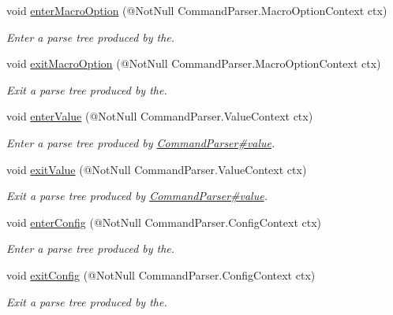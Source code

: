 \begin{DoxyCompactItemize}
void \hyperlink{interfaceedu_1_1udel_1_1cis_1_1vsl_1_1civl_1_1run_1_1common_1_1CommandListener_a5597c066408f2cfd680e14f0e695cbef}{enter\+Macro\+Option} (@Not\+Null Command\+Parser.\+Macro\+Option\+Context ctx)
\begin{DoxyCompactList}\small\item\em Enter a parse tree produced by the. \end{DoxyCompactList}\item 
void \hyperlink{interfaceedu_1_1udel_1_1cis_1_1vsl_1_1civl_1_1run_1_1common_1_1CommandListener_aad9c8bd2f680f4a643cb0f66ca9ee0d4}{exit\+Macro\+Option} (@Not\+Null Command\+Parser.\+Macro\+Option\+Context ctx)
\begin{DoxyCompactList}\small\item\em Exit a parse tree produced by the. \end{DoxyCompactList}\item 
void \hyperlink{interfaceedu_1_1udel_1_1cis_1_1vsl_1_1civl_1_1run_1_1common_1_1CommandListener_a819daf02b26ecfe5be342decf18c6515}{enter\+Value} (@Not\+Null Command\+Parser.\+Value\+Context ctx)
\begin{DoxyCompactList}\small\item\em Enter a parse tree produced by \hyperlink{}{Command\+Parser\#value}. \end{DoxyCompactList}\item 
void \hyperlink{interfaceedu_1_1udel_1_1cis_1_1vsl_1_1civl_1_1run_1_1common_1_1CommandListener_a5aa0d5b13176f22cf98964b03cc7badc}{exit\+Value} (@Not\+Null Command\+Parser.\+Value\+Context ctx)
\begin{DoxyCompactList}\small\item\em Exit a parse tree produced by \hyperlink{}{Command\+Parser\#value}. \end{DoxyCompactList}\item 
void \hyperlink{interfaceedu_1_1udel_1_1cis_1_1vsl_1_1civl_1_1run_1_1common_1_1CommandListener_aa903a72047e6e1896ea0c72d233246dc}{enter\+Config} (@Not\+Null Command\+Parser.\+Config\+Context ctx)
\begin{DoxyCompactList}\small\item\em Enter a parse tree produced by the. \end{DoxyCompactList}\item 
void \hyperlink{interfaceedu_1_1udel_1_1cis_1_1vsl_1_1civl_1_1run_1_1common_1_1CommandListener_af354b52c3554845618d56cc5d3ced877}{exit\+Config} (@Not\+Null Command\+Parser.\+Config\+Context ctx)
\begin{DoxyCompactList}\small\item\em Exit a parse tree produced by the. \end{DoxyCompactList}\item 

\end{DoxyCompactItemize}
